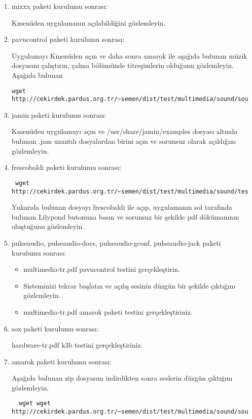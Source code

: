 \documentclass[a4paper,10pt]{article}
\begin{document}
\begin{enumerate}
\item mixxx paketi kurulumu sonrası:

Kmenüden uygulamanın açılabildiğini gözlemleyin.

\item pavucontrol paketi kurulumu sonrası:

Uygulamayı Kmenüden açın ve daha sonra amarok ile aşağıda bulunan müzik dosyasını çalıştırın, çalma bölümünde titreşimlerin olduğunu gözlemleyin.
Aşağıda bulunan
\begin{verbatim}
wget http://cekirdek.pardus.org.tr/~semen/dist/test/multimedia/sound/sound/sample.mp3
\end{verbatim}

\item jamin paketi kurulumu sonrası:

Kmenüden uygulamayı açın ve /usr/share/jamin/examples dosyası altında bulunan .jam uzantılı dosyalardan birini açın ve sorunsuz olarak açıldığını gözlemleyin.
\item frescobaldi paketi kurulumu sonrası:
 \begin{verbatim}
 wget http://cekirdek.pardus.org.tr/~semen/dist/test/multimedia/sound/test_frescobaldi.ly
 \end{verbatim}
Yukarıda bulunan dosyayı frescobaldi ile açıp, uygulamanın sol tarafında bulunan Lilypond butonuna basın ve sorunsuz bir şekilde pdf dökümanının oluştuğunu gözlemleyin.
\item pulseaudio, pulseaudio-docs, pulseaudio-gconf, pulseaudio-jack paketi kurulumu sonrası:
\begin{itemize}
 \item multimedia-tr.pdf pavucontrol testini gerçekleştirin.
 \item Sisteminizi tekrar başlatın ve açılış sesinin düzgün bir şekilde çıktığını gözlemleyin. 
 \item multimedia-tr.pdf amarok paketi testini gerçekleştiriniz.
\end{itemize}
\item sox paketi kurulumu sonrası:

hardware-tr.pdf k3b testini gerçekleştiriniz.
\item amarok paketi kurulumu sonrası:
 
Aşağıda bulunan zip dosyasını indirdikten sonra seslerin düzgün çıktığını gözlemleyin.
 \begin{verbatim}
  wget wget http://cekirdek.pardus.org.tr/~semen/dist/test/multimedia/sound/sound.tar
 \end{verbatim}	


\end{enumerate}
\end{document}
